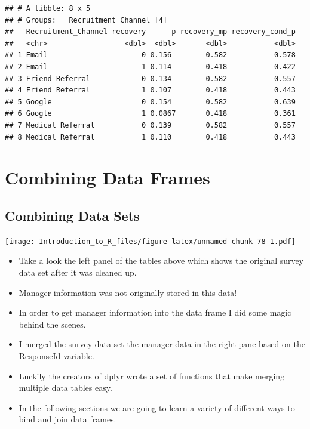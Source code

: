 \documentclass[]{book}
\providecommand{\tightlist}{%
  \setlength{\itemsep}{0pt}\setlength{\parskip}{0pt}}
\theoremstyle{definition}
\theoremstyle{definition}
\theoremstyle{definition}
\theoremstyle{remark}
\begin{document}
\begin{verbatim}
## # A tibble: 8 x 5
## # Groups:   Recruitment_Channel [4]
##   Recruitment_Channel recovery      p recovery_mp recovery_cond_p
##   <chr>                  <dbl>  <dbl>       <dbl>           <dbl>
## 1 Email                      0 0.156        0.582           0.578
## 2 Email                      1 0.114        0.418           0.422
## 3 Friend Referral            0 0.134        0.582           0.557
## 4 Friend Referral            1 0.107        0.418           0.443
## 5 Google                     0 0.154        0.582           0.639
## 6 Google                     1 0.0867       0.418           0.361
## 7 Medical Referral           0 0.139        0.582           0.557
## 8 Medical Referral           1 0.110        0.418           0.443
\end{verbatim}

\hypertarget{part-combining-data-frames}{%
\part{Combining Data Frames}\label{part-combining-data-frames}}

\hypertarget{combining-data-sets}{%
\chapter{Combining Data Sets}\label{combining-data-sets}}

\texttt{[image: Introduction\_to\_R\_files/figure-latex/unnamed-chunk-78-1.pdf]}

\begin{itemize}
\tightlist
\item
  Take a look the left panel of the tables above which shows the original survey data set after it was cleaned up.
\item
  Manager information was not originally stored in this data!
\item
  In order to get manager information into the data frame I did some magic behind the scenes.
\item
  I merged the survey data set the manager data in the right pane based on the ResponseId variable.
\item
  Luckily the creators of dplyr wrote a set of functions that make merging multiple data tables easy.
\item
  In the following sections we are going to learn a variety of different ways to bind and join data frames.
\end{itemize}
\end{document}
